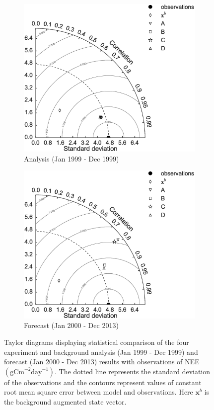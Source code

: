 \documentclass[11pt]{article}
\begin{document}
\begin{figure}[ht]
    \centering
    \begin{subfigure}[b]{0.49\textwidth}
        \includegraphics[width=\textwidth]{tdcvt_a.eps}
        \caption{Analysis (Jan 1999 - Dec 1999)}
        \label{fig:td_a}
    \end{subfigure}
    \begin{subfigure}[b]{0.49\textwidth}
        \includegraphics[width=\textwidth]{tdcvt_f.eps}
        \caption{Forecast (Jan 2000 - Dec 2013)}
        \label{fig:td_f}
    \end{subfigure}
    \caption{Taylor diagrams displaying statistical comparison of the four experiment and background analysis (Jan 1999 - Dec 1999) and forecast (Jan 2000 - Dec 2013) results with observations of NEE $( \text{gCm}^{-2}\text{day}^{-1})$. The dotted line represents the standard deviation of the observations and the contours represent values of constant root mean square error between model and observations. Here $\textbf{x}^{b}$ is the background augmented state vector.}
    \label{fig:taylordiag}
\end{figure}
\end{document}
